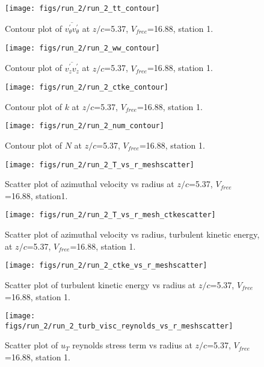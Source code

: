 \begin{figure}[H]
\centering
\texttt{[image: figs/run\_2/run\_2\_tt\_contour]}
\caption{Contour plot of $\overline{v_{\theta}^{\prime} v_{\theta}^{\prime}}$ at $z/c$=5.37, $V_{free}$=16.88, station 1.}
\end{figure}


\begin{figure}[H]
\centering
\texttt{[image: figs/run\_2/run\_2\_ww\_contour]}
\caption{Contour plot of $\overline{v_{z}^{\prime} v_{z}^{\prime}}$ at $z/c$=5.37, $V_{free}$=16.88, station 1.}
\end{figure}


\begin{figure}[H]
\centering
\texttt{[image: figs/run\_2/run\_2\_ctke\_contour]}
\caption{Contour plot of $k$ at $z/c$=5.37, $V_{free}$=16.88, station 1.}
\end{figure}


\begin{figure}[H]
\centering
\texttt{[image: figs/run\_2/run\_2\_num\_contour]}
\caption{Contour plot of $N$ at $z/c$=5.37, $V_{free}$=16.88, station 1.}
\end{figure}


\begin{figure}[H]
\centering
\texttt{[image: figs/run\_2/run\_2\_T\_vs\_r\_meshscatter]}
\caption{Scatter plot of azimuthal velocity vs radius at $z/c$=5.37, $V_{free}$=16.88, station1.}
\end{figure}


\begin{figure}[H]
\centering
\texttt{[image: figs/run\_2/run\_2\_T\_vs\_r\_mesh\_ctkescatter]}
\caption{Scatter plot of azimuthal velocity vs radius, turbulent kinetic energy, at $z/c$=5.37, $V_{free}$=16.88, station 1.}
\end{figure}


\begin{figure}[H]
\centering
\texttt{[image: figs/run\_2/run\_2\_ctke\_vs\_r\_meshscatter]}
\caption{Scatter plot of turbulent kinetic energy vs radius at $z/c$=5.37, $V_{free}$=16.88, station 1.}
\end{figure}


\begin{figure}[H]
\centering
\texttt{[image: figs/run\_2/run\_2\_turb\_visc\_reynolds\_vs\_r\_meshscatter]}
\caption{Scatter plot of $
u_T$ reynolds stress term vs radius at $z/c$=5.37, $V_{free}$=16.88, station 1.}
\end{figure}


